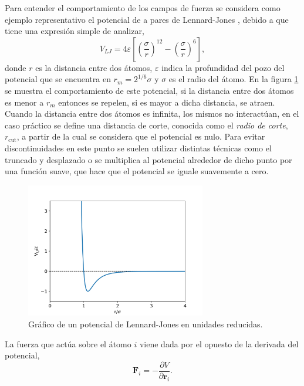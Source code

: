 Para entender el comportamiento de los campos de fuerza se considera como ejemplo 
representativo el potencial de a pares de Lennard-Jones \cite{lennard-jones}, 
debido a que tiene una expresión simple de analizar,
\begin{equation}
    V_{LJ} = 4\varepsilon \left[ \left( \frac{\sigma}{r} \right)^{12} - \left( \frac{\sigma}{r} \right)^{6} \right],
\end{equation}
donde $r$ es la distancia entre dos átomos, $\varepsilon$ indica la profundidad 
del pozo del potencial que se encuentra en $r_m = 2^{1/6} \sigma$ y $\sigma$ es el
radio del átomo. En la figura \ref{fig:lj} se muestra el comportamiento de este
potencial, si la distancia entre dos átomos es menor a $r_m$ entonces se repelen,
si es mayor a dicha distancia, se atraen. Cuando la distancia entre dos átomos es 
infinita, los mismos no interactúan, en el caso práctico se define una distancia 
de corte, conocida como el \textit{radio de corte}, $r_{\text{cut}}$, a partir de 
la cual se considera que el potencial es nulo. Para evitar discontinuidades en 
este punto se suelen utilizar distintas técnicas como el truncado y desplazado o 
se multiplica al potencial alrededor de dicho punto por una función suave, que 
hace que el potencial se iguale suavemente a cero.
\begin{figure}
    \centering
    \includegraphics[width=0.7\textwidth]{Metodos/atomicos/lj.png}
    \caption{Gráfico de un potencial de Lennard-Jones en unidades reducidas.}
    \label{fig:lj}
\end{figure}

La fuerza que actúa sobre el átomo $i$ viene dada por el opuesto de la derivada 
del potencial,
\begin{equation}\label{eq:fuerzas}
    \mathbf{F}_i = - \frac{\partial V}{\partial \mathbf{r}_i}.
\end{equation}

